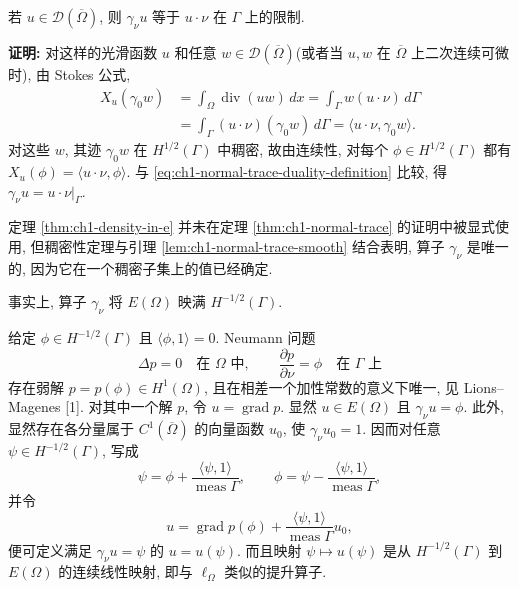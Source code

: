 \begin{Proof}
\begin{Lemma}
\label{lem:ch1-normal-trace-smooth}
若 $u\in\mathbf{\mathcal D}(\overline\Omega)$, 则 $\gamma_\nu u$ 等于 $u\cdot\nu$ 在 $\Gamma$ 上的限制.
\end{Lemma}

\par\vspace{0.1cm}\noindent\textbf{证明:}\quad
对这样的光滑函数 $u$ 和任意 $w\in\mathcal D(\overline\Omega)$(或者当 $u,w$ 在 $\overline\Omega$ 上二次连续可微时), 由 Stokes 公式,
\begin{align*}
X_u(\gamma_0w)
&=\int_\Omega\operatorname{div}(uw)\,dx
=\int_\Gamma w(u\cdot\nu)\,d\Gamma\\
&=\int_\Gamma(u\cdot\nu)(\gamma_0w)\,d\Gamma
=\langle u\cdot\nu,\gamma_0w\rangle.
\end{align*}
对这些 $w$, 其迹 $\gamma_0w$ 在 $H^{1/2}(\Gamma)$ 中稠密, 故由连续性, 对每个 $\phi\in H^{1/2}(\Gamma)$ 都有 $X_u(\phi)=\langle u\cdot\nu,\phi\rangle$. 与 \eqref{eq:ch1-normal-trace-duality-definition} 比较, 得 $\gamma_\nu u=u\cdot\nu|_\Gamma$.
\end{Proof}

\begin{Remark}
\label{rem:ch1-normal-trace-uniqueness}
定理 \ref{thm:ch1-density-in-e} 并未在定理 \ref{thm:ch1-normal-trace} 的证明中被显式使用, 但稠密性定理与引理 \ref{lem:ch1-normal-trace-smooth} 结合表明, 算子 $\gamma_\nu$ 是唯一的, 因为它在一个稠密子集上的值已经确定.
\end{Remark}

\begin{Remark}
\label{rem:ch1-normal-trace-surjective}
事实上, 算子 $\gamma_\nu$ 将 $E(\Omega)$ 映满 $H^{-1/2}(\Gamma)$.

给定 $\phi\in H^{-1/2}(\Gamma)$ 且 $\langle\phi,1\rangle=0$. Neumann 问题
\begin{equation}
\Delta p=0\quad\text{在 }\Omega\text{ 中},
\qquad \frac{\partial p}{\partial\nu}=\phi\quad\text{在 }\Gamma\text{ 上}
\label{eq:ch1-neumann-lifting-problem}
\end{equation}
存在弱解 $p=p(\phi)\in H^1(\Omega)$, 且在相差一个加性常数的意义下唯一, 见 Lions--Magenes [1]. 对其中一个解 $p$, 令 $u=\operatorname{grad}p$. 显然 $u\in E(\Omega)$ 且 $\gamma_\nu u=\phi$. 此外, 显然存在各分量属于 $C^1(\overline\Omega)$ 的向量函数 $u_0$, 使 $\gamma_\nu u_0=1$. 因而对任意 $\psi\in H^{-1/2}(\Gamma)$, 写成
\begin{equation}
\psi=\phi+\frac{\langle\psi,1\rangle}{\operatorname{meas}\Gamma},
\qquad
\phi=\psi-\frac{\langle\psi,1\rangle}{\operatorname{meas}\Gamma},
\label{eq:ch1-normal-trace-mean-splitting}
\end{equation}
并令
\begin{equation}
u=\operatorname{grad}p(\phi)
+\frac{\langle\psi,1\rangle}{\operatorname{meas}\Gamma}u_0,
\label{eq:ch1-normal-trace-lifting}
\end{equation}
便可定义满足 $\gamma_\nu u=\psi$ 的 $u=u(\psi)$. 而且映射 $\psi\mapsto u(\psi)$ 是从 $H^{-1/2}(\Gamma)$ 到 $E(\Omega)$ 的连续线性映射, 即与 $\ell_\Omega$ 类似的提升算子.
\end{Remark}

